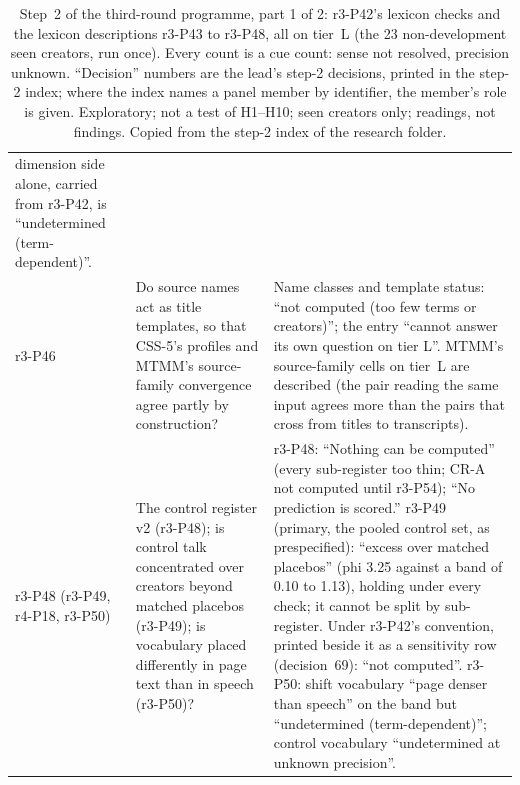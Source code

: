 \begin{table}[tp]
\begin{tabular}{@{}>{\raggedright\arraybackslash}p{}>{\raggedright\arraybackslash}p{}p{}@{}}
dimension side alone, carried from r3-P42, is ``undetermined (term-dependent)''. \\
r3-P46 & Do source names act as title templates, so that CSS-5's profiles and MTMM's source-family convergence agree
partly by construction? & Name classes and template status: ``not computed (too few terms or creators)''; the entry
``cannot answer its own question on tier L''. MTMM's source-family cells on tier~L are described (the pair reading the
same input agrees more than the pairs that cross from titles to transcripts). \\
r3-P48 (r3-P49, r4-P18, r3-P50) & The control register v2 (r3-P48); is control talk concentrated over creators beyond
matched placebos (r3-P49); is vocabulary placed differently in page text than in speech (r3-P50)? & r3-P48: ``Nothing
can be computed'' (every sub-register too thin; CR-A not computed until r3-P54); ``No prediction is scored.'' r3-P49
(primary, the pooled control set, as prespecified): ``excess over matched placebos'' (phi 3.25 against a band of 0.10 to
1.13), holding under every check; it cannot be split by sub-register. Under r3-P42's convention, printed beside it as a
sensitivity row (decision~69): ``not computed''. r3-P50: shift vocabulary ``page denser than speech'' on the band but
``undetermined (term-dependent)''; control vocabulary ``undetermined at unknown precision''. \\
\bottomrule
\end{tabular}
\caption{Step~2 of the third-round programme, part 1 of 2: r3-P42's lexicon checks and the lexicon descriptions r3-P43 to r3-P48,
all on tier~L (the 23 non-development seen creators, run once). Every count is a cue count: sense not resolved,
precision unknown. ``Decision'' numbers are the lead's step-2 decisions, printed in the step-2 index; where the index names
a panel member by identifier, the member's role is given. Exploratory; not a
test of H1--H10; seen creators only; readings, not findings. Copied from the step-2 index of the research folder.
\LabelValidity}
\label{tab:panel3-step2}
\end{table}

